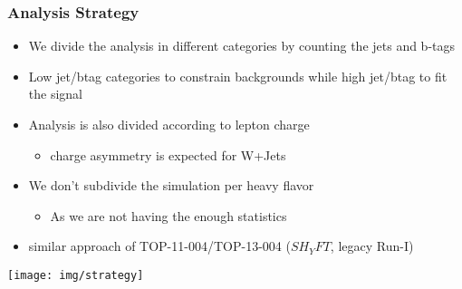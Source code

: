 \documentclass{beamer}
\begin{document}
\begin{frame}
\frametitle{Analysis Strategy}
\scriptsize
\begin{itemize}
\item We divide the analysis in different categories by counting the jets and b-tags
\item Low jet/btag categories to constrain backgrounds while high jet/btag to fit the signal
\item Analysis is also divided according to lepton charge
\begin{itemize}
\item charge asymmetry is expected for W+Jets
\end{itemize}
\item We don't subdivide the simulation per heavy flavor
\begin{itemize}
\item As we are not having the enough statistics
\end{itemize}
\item similar approach of TOP-11-004/TOP-13-004 ($SH_YFT$, legacy Run-I)
\end{itemize}
\begin{center}
 \texttt{[image: img/strategy]}
\end{center}
\end{frame}
\end{document}
